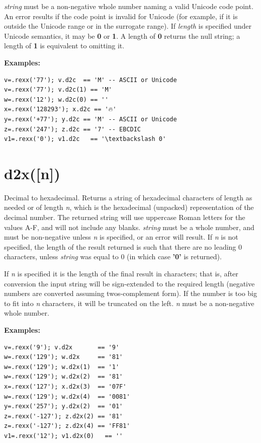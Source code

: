 \emph{string} must be a non-negative whole number naming a valid Unicode code
point. An error results if the code point is invalid for Unicode (for example,
if it is outside the Unicode range or in the surrogate range).
If \emph{length} is specified under Unicode semantics, it may be \textbf{0} or
\textbf{1}. A length of \textbf{0} returns the null string; a length of
\textbf{1} is equivalent to omitting it.
 
\textbf{Examples:}
\begin{lstlisting}
v=.rexx('77'); v.d2c  == 'M' -- ASCII or Unicode
v=.rexx('77'); v.d2c(1) == 'M'
w=.rexx('12'); w.d2c(0) == ''
x=.rexx('128293'); x.d2c == '🔥'
y=.rexx('+77'); y.d2c == 'M' -- ASCII or Unicode
z=.rexx('247'); z.d2c == '7' -- EBCDIC
v1=.rexx('0'); v1.d2c   == '\textbackslash 0'
\end{lstlisting}
\section{d2x([n])}\label{refd2x}

Decimal to hexadecimal.
Returns a string of hexadecimal characters of length as needed or of
length \emph{n}, which is the hexadecimal (unpacked) representation
of the decimal number.  The returned string will use uppercase
Roman letters for the values A-F, and will not include any blanks.
 \emph{string} must be a whole number, and must be non-negative
unless \emph{n} is specified, or an error will result.
If \emph{n} is not specified, the length of the result returned is
such that there are no leading 0 characters, unless \emph{string}
was equal to 0 (in which case \textbf{'0'} is returned).
 
If \emph{n} is specified it is the length of the final result in
characters; that is, after conversion the input string will be
sign-extended to the required length (negative numbers are converted
assuming twos-complement form).
If the number is too big to fit into \emph{n} characters, it will be
truncated on the left.
\emph{n} must be a non-negative whole number.
 
\textbf{Examples:}
\begin{lstlisting}
v=.rexx('9'); v.d2x       == '9'
w=.rexx('129'); w.d2x     == '81'
w=.rexx('129'); w.d2x(1)  == '1'
w=.rexx('129'); w.d2x(2)  == '81'
x=.rexx('127'); x.d2x(3)  == '07F'
w=.rexx('129'); w.d2x(4)  == '0081'
y=.rexx('257'); y.d2x(2)  == '01'
z=.rexx('-127'); z.d2x(2) == '81'
z=.rexx('-127'); z.d2x(4) == 'FF81'
v1=.rexx('12'); v1.d2x(0)   == ''
\end{lstlisting}

